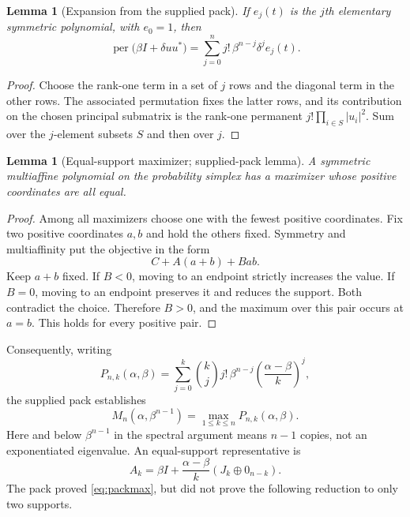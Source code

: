 \documentclass[11pt]{article}
\newcommand{\per}{\operatorname{per}}
\newtheorem{lemma}[theorem]{Lemma}
\theoremstyle{definition}\newtheorem{definition}[theorem]{Definition}
\theoremstyle{remark}\newtheorem{remark}[theorem]{Remark}
\begin{document}
\begin{lemma}[Expansion from the supplied pack]\label{lem:expansion}
If $e_j(t)$ is the $j$th elementary symmetric polynomial, with $e_0=1$, then
\begin{equation}\label{eq:rankoneexpansion}
 \per\bigl(\beta I+\delta uu^*\bigr)
 =\sum_{j=0}^n j!\,\beta^{n-j}\delta^j e_j(t).
\end{equation}
\end{lemma}
\begin{proof}
Choose the rank-one term in a set of $j$ rows and the diagonal term in the other rows. The associated permutation fixes the latter rows, and its contribution on the chosen principal submatrix is the rank-one permanent $j!\prod_{i\in S}|u_i|^2$. Sum over the $j$-element subsets $S$ and then over $j$.
\end{proof}

\begin{lemma}[Equal-support maximizer; supplied-pack lemma]\label{lem:simplex}
A symmetric multiaffine polynomial on the probability simplex has a maximizer whose positive coordinates are all equal.
\end{lemma}
\begin{proof}
Among all maximizers choose one with the fewest positive coordinates. Fix two positive coordinates $a,b$ and hold the others fixed. Symmetry and multiaffinity put the objective in the form
\[
 C+A(a+b)+Bab.
\]
Keep $a+b$ fixed. If $B<0$, moving to an endpoint strictly increases the value. If $B=0$, moving to an endpoint preserves it and reduces the support. Both contradict the choice. Therefore $B>0$, and the maximum over this pair occurs at $a=b$. This holds for every positive pair.
\end{proof}

Consequently, writing
\begin{equation}\label{eq:Pk}
 P_{n,k}(\alpha,\beta)=
 \sum_{j=0}^k\binom{k}{j}j!\,\beta^{n-j}
                  \left(\frac{\alpha-\beta}{k}\right)^j,
\end{equation}
the supplied pack establishes
\begin{equation}\label{eq:packmax}
 M_n(\alpha,\beta^{n-1})=\max_{1\leq k\leq n}P_{n,k}(\alpha,\beta).
\end{equation}
Here and below $\beta^{n-1}$ in the spectral argument means $n-1$ copies, not an exponentiated eigenvalue. An equal-support representative is
\begin{equation}\label{eq:Hk}
 A_k=\beta I+\frac{\alpha-\beta}{k}(J_k\oplus0_{n-k}).
\end{equation}
The pack proved \eqref{eq:packmax}, but did not prove the following reduction to only two supports.
\end{document}
